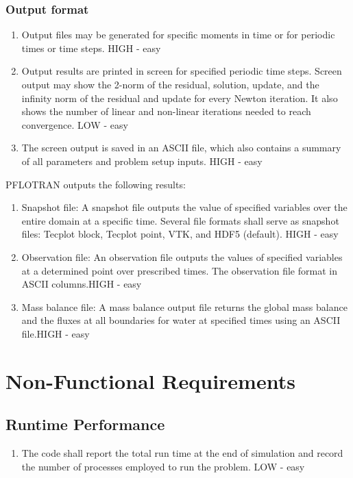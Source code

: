 \subsubsection{Output format}
\begin{enumerate}[label=UI \arabic*.,ref=UI \arabic*,nosep, resume]
	\item Output files may be generated for specific moments in time or for periodic times or time steps. \label{outputSpecs} HIGH - easy
	\item Output results are printed in screen for specified periodic time steps. Screen output may show the 2-norm of the residual, solution, update, and the infinity norm of the residual and update for every Newton iteration. It also shows the number of linear and non-linear iterations needed to reach convergence. \label{outputPrintScreen} LOW - easy
	\item The screen output is saved in an ASCII file, which also contains a summary of all parameters and problem setup inputs. \label{outputFile} HIGH - easy
\end{enumerate}

PFLOTRAN outputs the following results: 

\begin{enumerate}[label=UI \arabic*.,ref=UI \arabic*,nosep, resume]
	\item Snapshot file: \label{outSnapshot}A snapshot file outputs the value of specified variables over the entire domain at a specific time. Several file formats shall serve as snapshot files: Tecplot block, Tecplot point, VTK, and HDF5 (default). HIGH - easy
	\item Observation file: \label{outObservation}An observation file outputs the values of specified variables at a determined point over prescribed times. The observation file format in ASCII columns.HIGH - easy
	\item Mass balance file: \label{outMassBalance}A mass balance output file returns the global mass balance and the fluxes at all boundaries for water at specified times using an ASCII file.HIGH - easy
\end{enumerate}

\section{Non-Functional Requirements}
\subsection{Runtime Performance}
\begin{enumerate}[label=NFR \arabic*.,ref=NFR \arabic*,nosep]
	\item The code shall report the total run time at the end of simulation and record the number of processes employed to run the problem. LOW - easy
\end{enumerate}

